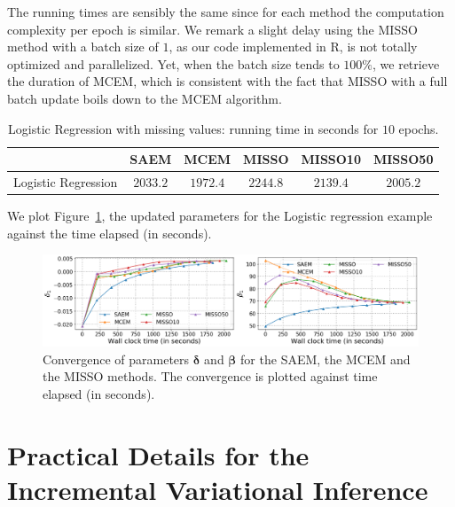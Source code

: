 \documentclass{article}
\begin{document}
The running times are sensibly the same since for each method the computation complexity per epoch is similar.
We remark a slight delay using the MISSO method with a batch size of $1$, as our code implemented in R, is not totally optimized and parallelized.
Yet, when the batch size tends to $100\%$, we retrieve the duration of MCEM, which is consistent with the fact that MISSO with a full batch update boils down to the MCEM algorithm.

\begin{table}[H]
\begin{center}
\caption{Logistic Regression with missing values: running time in seconds for $10$ epochs.}
\begin{tabular}{SSSSSS} \toprule
 & {SAEM} & {MCEM} & {MISSO} & {MISSO10} & {MISSO50} \\ \midrule
{Logistic Regression}  & {$2033.2$} & {$1972.4$} & {$2244.8$} & {$2139.4$} & {$2005.2$}  \\ \bottomrule
\end{tabular}
\label{tab:tablelogisitc}
\end{center}
\end{table}

We plot Figure~\ref{fig:misso_trauma_wallclock}, the updated parameters for the Logistic regression example against the time elapsed (in seconds).

\begin{figure}[H]
\includegraphics[width=\textwidth]{pic_paper/traumabasenoexp_wallclock.png}\vspace{-.2cm}
\caption{Convergence of parameters ${\bm \delta}$ and ${\bm \beta}$ for the SAEM, the MCEM and the MISSO methods. The convergence is plotted against time elapsed (in seconds).}\vspace{-.2cm}
\label{fig:misso_trauma_wallclock}
\end{figure}


\vspace{0.2in}

 \section{Practical Details for the Incremental Variational Inference}\label{appendix:vimisso}
\end{document}
